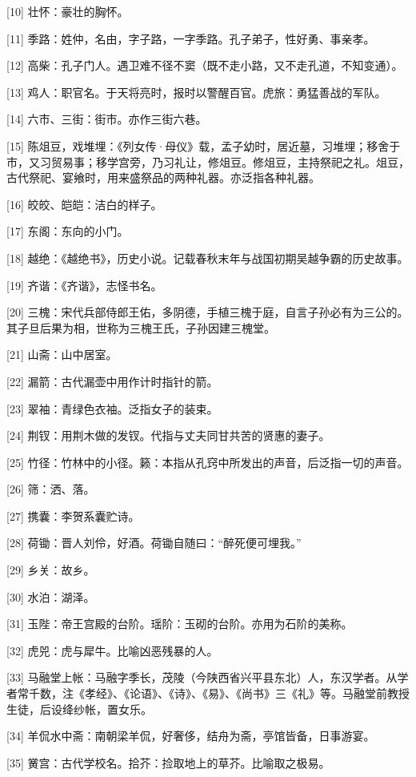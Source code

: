 \documentclass[12pt,UTF8]{ctexbook}
\begin{document}
[10] 壮怀：豪壮的胸怀。

[11] 季路：姓仲，名由，字子路，一字季路。孔子弟子，性好勇、事亲孝。

[12] 高柴：孔子门人。遇卫难不径不窦（既不走小路，又不走孔道，不知变通）。

[13] 鸡人：职官名。于天将亮时，报时以警醒百官。虎旅：勇猛善战的军队。

[14] 六市、三街：街市。亦作三街六巷。

[15] 陈俎豆，戏堆埋：《列女传·母仪》载，孟子幼时，居近墓，习堆埋；移舍于市，又习贸易事；移学宫旁，乃习礼让，修俎豆。修俎豆，主持祭祀之礼。俎豆，古代祭祀、宴飨时，用来盛祭品的两种礼器。亦泛指各种礼器。

[16] 皎皎、皑皑：洁白的样子。

[17] 东阁：东向的小门。

[18] 越绝：《越绝书》，历史小说。记载春秋末年与战国初期吴越争霸的历史故事。

[19] 齐谐：《齐谐》，志怪书名。

[20] 三槐：宋代兵部侍郎王佑，多阴德，手植三槐于庭，自言子孙必有为三公的。其子旦后果为相，世称为三槐王氏，子孙因建三槐堂。

[21] 山斋：山中居室。

[22] 漏箭：古代漏壶中用作计时指针的箭。

[23] 翠袖：青绿色衣袖。泛指女子的装束。

[24] 荆钗：用荆木做的发钗。代指与丈夫同甘共苦的贤惠的妻子。

[25] 竹径：竹林中的小径。籁：本指从孔窍中所发出的声音，后泛指一切的声音。

[26] 筛：洒、落。

[27] 携囊：李贺系囊贮诗。

[28] 荷锄：晋人刘伶，好酒。荷锄自随曰：“醉死便可埋我。”

[29] 乡关：故乡。

[30] 水泊：湖泽。

[31] 玉陛：帝王宫殿的台阶。瑶阶：玉砌的台阶。亦用为石阶的美称。

[32] 虎兕：虎与犀牛。比喻凶恶残暴的人。

[33] 马融堂上帐：马融字季长，茂陵（今陕西省兴平县东北）人，东汉学者。从学者常千数，注《孝经》、《论语》、《诗》、《易》、《尚书》三《礼》等。马融堂前教授生徒，后设绛纱帐，置女乐。

[34] 羊侃水中斋：南朝梁羊侃，好奢侈，结舟为斋，亭馆皆备，日事游宴。

[35] 黉宫：古代学校名。拾芥：捡取地上的草芥。比喻取之极易。
\end{document}

